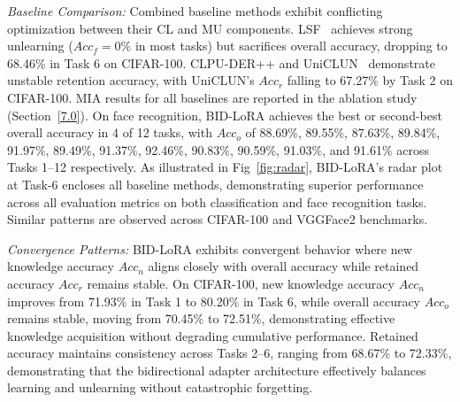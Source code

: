 \medskip
\noindent
\textit{Baseline Comparison:} Combined baseline methods exhibit conflicting optimization between their CL and MU components. LSF~\cite{shibata2021learning} achieves strong unlearning ($Acc_f = 0\%$ in most tasks) but sacrifices overall accuracy, dropping to 68.46\% in Task 6 on CIFAR-100. CLPU-DER++\cite{liu2022continual} and UniCLUN~\cite{chatterjee2024unified} demonstrate unstable retention accuracy, with UniCLUN's $Acc_r$ falling to 67.27\% by Task 2 on CIFAR-100. MIA results for all baselines are reported in the ablation study (Section~\ref{7.0}). On face recognition, BID-LoRA achieves the best or second-best overall accuracy in 4 of 12 tasks, with $Acc_o$ of 88.69\%, 89.55\%, 87.63\%, 89.84\%, 91.97\%, 89.49\%, 91.37\%, 92.46\%, 90.83\%, 90.59\%, 91.03\%, and 91.61\% across Tasks 1--12 respectively. As illustrated in Fig~\ref{fig:radar}, BID-LoRA's radar plot at Task-6 encloses all baseline methods, demonstrating superior performance across all evaluation metrics on both classification and face recognition tasks. Similar patterns are observed across CIFAR-100 and VGGFace2 benchmarks.

\medskip
\noindent
\textit{Convergence Patterns:} BID-LoRA exhibits convergent behavior where new knowledge accuracy $Acc_n$ aligns closely with overall accuracy while retained accuracy $Acc_r$ remains stable. On CIFAR-100, new knowledge accuracy $Acc_n$ improves from 71.93\% in Task 1 to 80.20\% in Task 6, while overall accuracy $Acc_o$ remains stable, moving from 70.45\% to 72.51\%, demonstrating effective knowledge acquisition without degrading cumulative performance. Retained accuracy maintains consistency across Tasks 2--6, ranging from 68.67\% to 72.33\%, demonstrating that the bidirectional adapter architecture effectively balances learning and unlearning without catastrophic forgetting.